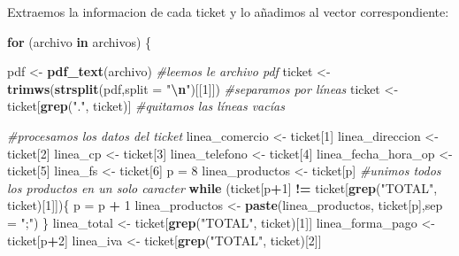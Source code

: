 \documentclass[,,,oneauthor,pdftex]{Definitions/mdpi}
\newenvironment{Shaded}{\begin{snugshade}}{\end{snugshade}}
\newcommand{\AttributeTok}[1]{\textcolor[rgb]{0.13,0.29,0.53}{#1}}
\newcommand{\CommentTok}[1]{\textcolor[rgb]{0.56,0.35,0.01}{\textit{#1}}}
\newcommand{\ControlFlowTok}[1]{\textcolor[rgb]{0.13,0.29,0.53}{\textbf{#1}}}
\newcommand{\DecValTok}[1]{\textcolor[rgb]{0.00,0.00,0.81}{#1}}
\newcommand{\FunctionTok}[1]{\textcolor[rgb]{0.13,0.29,0.53}{\textbf{#1}}}
\newcommand{\NormalTok}[1]{#1}
\newcommand{\OtherTok}[1]{\textcolor[rgb]{0.56,0.35,0.01}{#1}}
\newcommand{\SpecialCharTok}[1]{\textcolor[rgb]{0.81,0.36,0.00}{\textbf{#1}}}
\newcommand{\StringTok}[1]{\textcolor[rgb]{0.31,0.60,0.02}{#1}}
\begin{document}
Extraemos la informacion de cada ticket y lo añadimos al vector
correspondiente:

\begin{Shaded}
\begin{Highlighting}[]
\ControlFlowTok{for}\NormalTok{ (archivo }\ControlFlowTok{in}\NormalTok{ archivos) \{}
  
\NormalTok{  pdf }\OtherTok{\textless{}{-}} \FunctionTok{pdf\_text}\NormalTok{(archivo) }\CommentTok{\#leemos le archivo pdf}
\NormalTok{  ticket }\OtherTok{\textless{}{-}} \FunctionTok{trimws}\NormalTok{(}\FunctionTok{strsplit}\NormalTok{(pdf,}\AttributeTok{split =} \StringTok{"}\SpecialCharTok{\textbackslash{}n}\StringTok{"}\NormalTok{)[[}\DecValTok{1}\NormalTok{]]) }\CommentTok{\#separamos por líneas}
\NormalTok{  ticket }\OtherTok{\textless{}{-}}\NormalTok{ ticket[}\FunctionTok{grep}\NormalTok{(}\StringTok{"."}\NormalTok{, ticket)] }\CommentTok{\#quitamos las líneas vacías}

  \CommentTok{\#procesamos los datos del ticket}
\NormalTok{  linea\_comercio }\OtherTok{\textless{}{-}}\NormalTok{ ticket[}\DecValTok{1}\NormalTok{]}
\NormalTok{  linea\_direccion }\OtherTok{\textless{}{-}}\NormalTok{ ticket[}\DecValTok{2}\NormalTok{]}
\NormalTok{  linea\_cp }\OtherTok{\textless{}{-}}\NormalTok{ ticket[}\DecValTok{3}\NormalTok{]}
\NormalTok{  linea\_telefono }\OtherTok{\textless{}{-}}\NormalTok{ ticket[}\DecValTok{4}\NormalTok{]}
\NormalTok{  linea\_fecha\_hora\_op }\OtherTok{\textless{}{-}}\NormalTok{ ticket[}\DecValTok{5}\NormalTok{]}
\NormalTok{  linea\_fs }\OtherTok{\textless{}{-}}\NormalTok{ ticket[}\DecValTok{6}\NormalTok{]}
\NormalTok{  p }\OtherTok{=} \DecValTok{8} 
\NormalTok{  linea\_productos }\OtherTok{\textless{}{-}}\NormalTok{ ticket[p]}
    \CommentTok{\#unimos todos los productos en un solo caracter}
  \ControlFlowTok{while}\NormalTok{ (ticket[p}\SpecialCharTok{+}\DecValTok{1}\NormalTok{] }\SpecialCharTok{!=}\NormalTok{ ticket[}\FunctionTok{grep}\NormalTok{(}\StringTok{"TOTAL"}\NormalTok{, ticket)[}\DecValTok{1}\NormalTok{]])\{}
\NormalTok{    p }\OtherTok{=}\NormalTok{ p }\SpecialCharTok{+} \DecValTok{1}
\NormalTok{    linea\_productos }\OtherTok{\textless{}{-}} \FunctionTok{paste}\NormalTok{(linea\_productos, ticket[p],}\AttributeTok{sep =} \StringTok{";"}\NormalTok{)}
\NormalTok{  \}}
\NormalTok{  linea\_total }\OtherTok{\textless{}{-}}\NormalTok{ ticket[}\FunctionTok{grep}\NormalTok{(}\StringTok{"TOTAL"}\NormalTok{, ticket)[}\DecValTok{1}\NormalTok{]]}
\NormalTok{  linea\_forma\_pago }\OtherTok{\textless{}{-}}\NormalTok{ ticket[p}\SpecialCharTok{+}\DecValTok{2}\NormalTok{]}
\NormalTok{  linea\_iva }\OtherTok{\textless{}{-}}\NormalTok{ ticket[}\FunctionTok{grep}\NormalTok{(}\StringTok{"TOTAL"}\NormalTok{, ticket)[}\DecValTok{2}\NormalTok{]]}
  

\end{Highlighting}
\end{Shaded}
\end{document}
